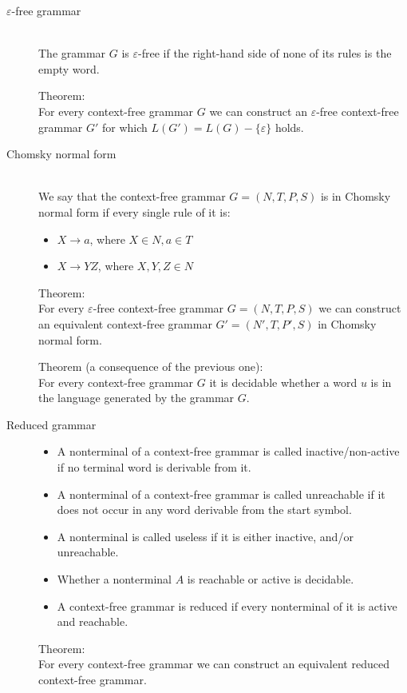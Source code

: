 \documentclass[margin=0px]{article}
\begin{document}
\begin{description}
    \item[$\varepsilon$-free grammar] \hfill \\
        The grammar $G$ is $\varepsilon$-free if the right-hand side of none of its rules is the empty word.

        Theorem:\\
        For every context-free grammar $G$ we can construct an $\varepsilon$-free context-free grammar $G'$ for which $L(G') = L(G) - \{\varepsilon\}$ holds.
    \item[Chomsky normal form] \hfill \\
        We say that the context-free grammar $G = (N, T, P, S)$ is in Chomsky normal form if every single rule of it is:
        \begin{itemize}
            \item $X \rightarrow a$, where $X \in N, a \in T$
            \item $X \rightarrow YZ$, where $X,Y,Z \in N$
        \end{itemize}
        Theorem:\\
        For every $\varepsilon$-free context-free grammar $G=(N,T,P,S)$ we can construct an equivalent context-free grammar $G' = (N', T, P', S)$ in Chomsky normal form.

        Theorem (a consequence of the previous one):\\
        For every context-free grammar $G$ it is decidable whether a word $u$ is in the language generated by the grammar $G$.
    \item[Reduced grammar] \hfill
        \begin{itemize}
            \item A nonterminal of a context-free grammar is called inactive/non-active if no terminal word is derivable from it.
            \item A nonterminal of a context-free grammar is called unreachable if it does not occur in any word derivable from the start symbol.
            \item A nonterminal is called useless if it is either inactive, and/or unreachable.
            \item Whether a nonterminal $A$ is reachable or active is decidable.
            \item A context-free grammar is reduced if every nonterminal of it is active and reachable.
        \end{itemize}
        Theorem:\\
        For every context-free grammar we can construct an equivalent reduced context-free grammar.

\end{description}
\end{document}
